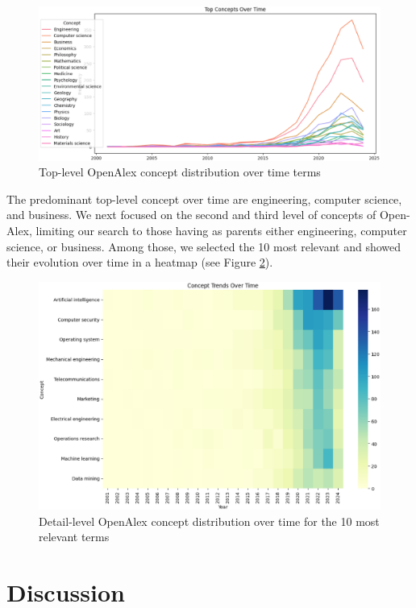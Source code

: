 \documentclass[a4paper, review, endfloat, authoryear]{elsarticle}
\begin{document}
	\begin{figure}[htbp]
		\centering
		\includegraphics[width=\linewidth]{pics/main_concept_trend_toplevel.eps}
		\caption{Top-level OpenAlex concept distribution over time terms}\label{fig:fig13}
	\end{figure}
	
	The predominant top-level concept over time are engineering, computer science, and business. We next focused on the second and third level of concepts of Open-Alex, limiting our search to those having as parents either engineering, computer science, or business. Among those, we selected the 10 most relevant and showed their evolution over time in a heatmap (see Figure \ref{fig:fig14}).
	
	\begin{figure}[htbp]
		\centering
		\includegraphics[width=\linewidth]{pics/main_concept_trend_lowerlevels.eps}
		\caption{Detail-level OpenAlex concept distribution over time for the 10 most relevant terms}\label{fig:fig14}
	\end{figure}
	
	\section{Discussion}
	
\end{document}
